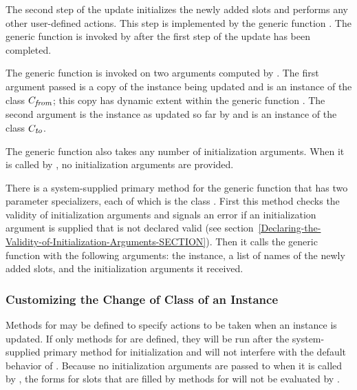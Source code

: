 The second step of the update initializes the newly added slots and
performs any other user-defined actions.  This step is implemented by
the generic function .  The
generic function  is invoked
by  after the first step of the update has been
completed.

The generic function  is
invoked on two arguments computed by .  The first
argument passed is a copy of the instance being updated and is an
instance of the class $C_{\hbox{{\footnotesize\it from}}}$; this copy has
dynamic extent within the generic function .  The
second argument is the instance as updated so far by 
and is an instance of the class $C_{\hbox{{\footnotesize\it to}}}$.

The generic function  also
takes any number of initialization arguments.  When it is called by
, no initialization arguments are provided.

There is a system-supplied primary method for the generic function
 that has two parameter
specializers, each of which is the class .  First
this method checks the validity of initialization arguments and
signals an error if an initialization argument is supplied that is not
declared valid (see section~\ref{Declaring-the-Validity-of-Initialization-Arguments-SECTION}).
Then it calls the
generic function  with the following arguments:
the instance, a list of names of the newly added slots, and the
initialization arguments it received.


\subsubsection{Customizing the Change of Class of an Instance}

Methods for  may be defined
to specify actions to be taken when an instance is updated.  If only
 methods for  are
defined, they will be run after the system-supplied primary method for
initialization and will not interfere with the default behavior of
.  Because no initialization
arguments are passed to  when
it is called by , the  forms for slots
that are filled by  methods for 
 will not be evaluated by 
.

